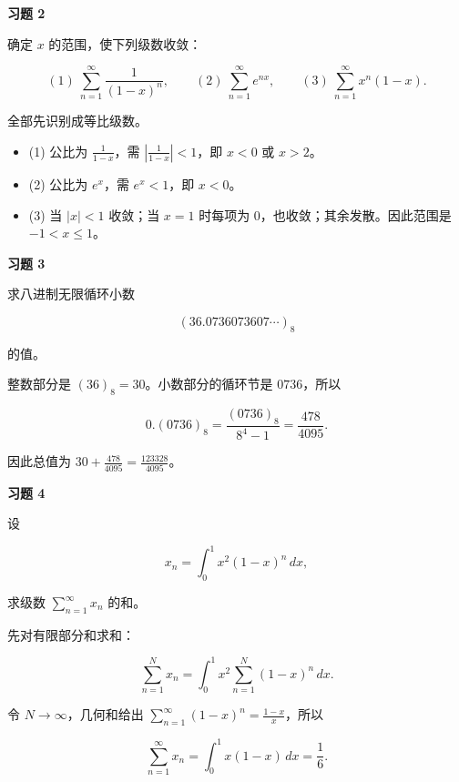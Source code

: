 \begin{exercisebox}
\textbf{习题 2 }

确定 \(x\) 的范围，使下列级数收敛：

\[
      (1)\ \sum_{n=1}^{\infty}\frac1{(1-x)^n},\qquad
      (2)\ \sum_{n=1}^{\infty}e^{nx},\qquad
      (3)\ \sum_{n=1}^{\infty}x^n(1-x).
      \]

\begin{hintbox}
全部先识别成等比级数。

\begin{itemize}
 \item (1) 公比为 \(\frac1{1-x}\)，需 \(\left|\frac1{1-x}\right|<1\)，即 \(x<0\) 或 \(x>2\)。
 \item (2) 公比为 \(e^x\)，需 \(e^x<1\)，即 \(x<0\)。
 \item (3) 当 \(|x|<1\) 收敛；当 \(x=1\) 时每项为 \(0\)，也收敛；其余发散。因此范围是 \(-1<x\le1\)。
 \end{itemize}
\end{hintbox}
\end{exercisebox}

\begin{exercisebox}
\textbf{习题 3 }

求八进制无限循环小数

\[
        (36.0736073607\cdots)_8
      \]

的值。

\begin{hintbox}
整数部分是 \((36)_8=30\)。小数部分的循环节是 \(0736\)，所以

\[
          0.(0736)_8=\frac{(0736)_8}{8^4-1}
          =
          \frac{478}{4095}.
        \]

因此总值为 \(\displaystyle 30+\frac{478}{4095}=\frac{123328}{4095}\)。
\end{hintbox}
\end{exercisebox}

\begin{exercisebox}
\textbf{习题 4 }

设

\[
        x_n=\int_0^1 x^2(1-x)^n\,dx,
      \]

求级数 \(\displaystyle \sum_{n=1}^{\infty}x_n\) 的和。

\begin{hintbox}
先对有限部分和求和：

\[
        \sum_{n=1}^{N}x_n
        =
        \int_0^1 x^2\sum_{n=1}^{N}(1-x)^n\,dx.
        \]

令 \(N\to\infty\)，几何和给出 \(\sum_{n=1}^{\infty}(1-x)^n=\frac{1-x}{x}\)，所以

\[
        \sum_{n=1}^{\infty}x_n
        =
        \int_0^1 x(1-x)\,dx
        =
        \frac16.
        \]
\end{hintbox}
\end{exercisebox}

